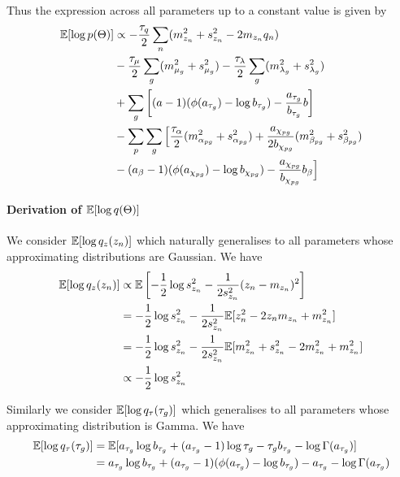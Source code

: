 Thus the expression across all parameters up to a constant value is given by
\begin{equation}
\begin{aligned}
\mathbb{E}[\log p(\Theta)] & \propto - \frac{\tau_q}{2}\sum_n (m_{z_n}^2 + s_{z_n}^2 - 2 m_{z_n} q_n) \\
& -\frac{\tau_\mu}{2} \sum_g (m_{\mu_g}^2 +  s_{\mu_g}^2)  - \frac{\tau_\lambda}{2} \sum_g (m_{\lambda_g}^2 + s_{\lambda_g}^2) \\
& + \sum_g \left[ (a-1)(\phi(a_{\tau_g}) - \log b_{\tau_g}) - \frac{a_{\tau_g}}{b_{\tau_g}} b \right] \\
& - \sum_p \sum_g \Big[ \frac{\tau_\alpha}{2} (m_{\alpha_{pg}}^2 + s_{\alpha_{pg}}^2) + \frac{a_{\chi_{pg}}}{2 b_{\chi_{pg}}} (m_{\beta_{pg}}^2 + s_{\beta_{pg}}^2) \\
& - (a_\beta - 1) (\phi(a_{\chi_{pg}}) - \log b_{\chi_{pg}} ) - \frac{a_{\chi_{pg}}}{b_{\chi_{pg}}} b_\beta \Big]
\end{aligned}
\end{equation}

\paragraph{Derivation of $\mathbb{E}[\log q(\Theta)]$}

We consider $\mathbb{E}[\log q_z (z_n)]$ which naturally generalises to all parameters whose approximating distributions are Gaussian. We have
\begin{equation}
\begin{aligned}
\mathbb{E}[\log q_z(z_n)] & \propto \mathbb{E}\left[ -\frac{1}{2} \log s_{z_n}^2 - \frac{1}{2 s_{z_n}^2} (z_n - m_{z_n})^2\right] \\
& = -\frac{1}{2} \log s_{z_n}^2 - \frac{1}{2 s_{z_n}^2} \mathbb{E}[ z_n^2 - 2 z_n m_{z_n} + m_{z_n}^2 ] \\
& = -\frac{1}{2} \log s_{z_n}^2 - \frac{1}{2 s_{z_n}^2} \mathbb{E}[ m_{z_n}^2 + s_{z_n}^2 - 2 m_{z_n}^2 + m_{z_n}^2 ] \\
& \propto-\frac{1}{2} \log s_{z_n}^2
\end{aligned}
\end{equation}

Similarly we consider $\mathbb{E}[\log q_\tau(\tau_g)]$ which generalises to all parameters whose approximating distribution is Gamma. We have
\begin{equation}
\begin{aligned}
\mathbb{E}[\log q_\tau(\tau_g)] & 
= \mathbb{E}[a_{\tau_g} \log b_{\tau_g} + (a_{\tau_g} - 1) \log \tau_g - \tau_g b_{\tau_g} -\log \Gamma(a_{\tau_g})] \\
& = a_{\tau_g} \log b_{\tau_g} + (a_{\tau_g} - 1)(\phi(a_{\tau_g}) - \log b_{\tau_g}) - a_{\tau_g} - \log \Gamma(a_{\tau_g})
\end{aligned}
\end{equation}


